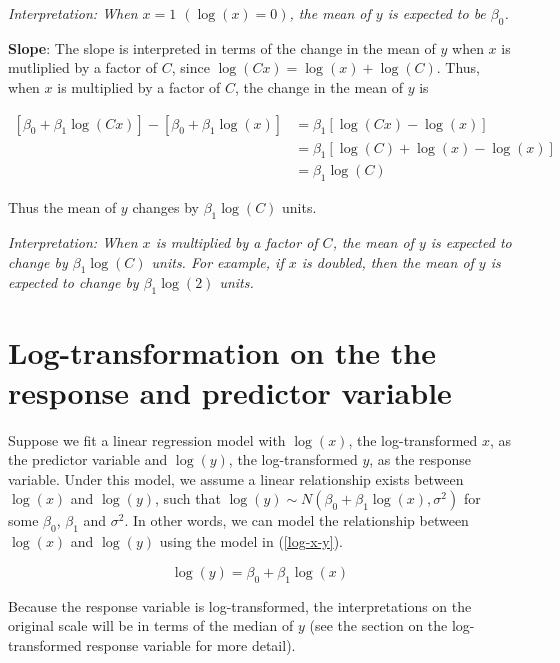 \documentclass[]{book}
\begin{document}
\emph{Interpretation: When \(x = 1\) \((\log(x) = 0)\), the mean of
\(y\) is expected to be \(\beta_0\).}

\textbf{Slope}: The slope is interpreted in terms of the change in the
mean of \(y\) when \(x\) is mutliplied by a factor of \(C\), since
\(\log(Cx) = \log(x) + \log(C)\). Thus, when \(x\) is multiplied by a
factor of \(C\), the change in the mean of \(y\) is

\begin{equation}
\begin{aligned}
[\beta_0 + \beta_1 \log(Cx)] - [\beta_0 + \beta_1 \log(x)] &= \beta_1 [\log(Cx) - \log(x)] \\[10pt] 
& = \beta_1[\log(C) + \log(x) - \log(x)] \\[10pt] 
& = \beta_1 \log(C)
\end{aligned}
\end{equation}

Thus the mean of \(y\) changes by \(\beta_1 \log(C)\) units.

\emph{Interpretation: When \(x\) is multiplied by a factor of \(C\), the
mean of \(y\) is expected to change by \(\beta_1 \log(C)\) units. For
example, if \(x\) is doubled, then the mean of \(y\) is expected to
change by \(\beta_1 \log(2)\) units.}

\section{Log-transformation on the the response and predictor
variable}\label{log-transformation-on-the-the-response-and-predictor-variable}

Suppose we fit a linear regression model with \(\log(x)\), the
log-transformed \(x\), as the predictor variable and \(\log(y)\), the
log-transformed \(y\), as the response variable. Under this model, we
assume a linear relationship exists between \(\log(x)\) and \(\log(y)\),
such that \(\log(y) \sim N(\beta_0 + \beta_1 \log(x), \sigma^2)\) for
some \(\beta_0\), \(\beta_1\) and \(\sigma^2\). In other words, we can
model the relationship between \(\log(x)\) and \(\log(y)\) using the
model in (\ref{log-x-y}).

\begin{equation}
\label{log-x-y}
\log(y) = \beta_0 + \beta_1 \log(x)
\end{equation}

Because the response variable is log-transformed, the interpretations on
the original scale will be in terms of the median of \(y\) (see the
section on the log-transformed response variable for more detail).
\end{document}
